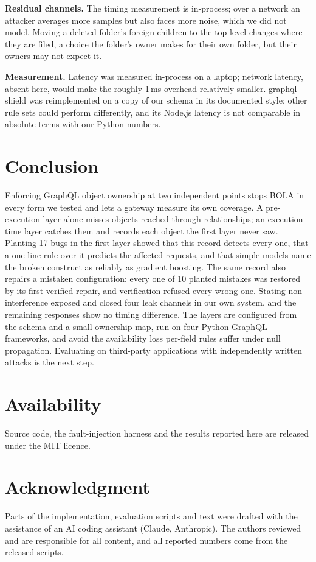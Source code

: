 \documentclass[conference]{IEEEtran}
\begin{document}
\textbf{Residual channels.} The timing measurement is in-process; over a network an attacker averages more samples but also faces more noise, which we did not model. Moving a deleted folder's foreign children to the top level changes where they are filed, a choice the folder's owner makes for their own folder, but their owners may not expect it.

\textbf{Measurement.} Latency was measured in-process on a laptop; network latency, absent here, would make the roughly 1\,ms overhead relatively smaller. graphql-shield was reimplemented on a copy of our schema in its documented style; other rule sets could perform differently, and its Node.js latency is not comparable in absolute terms with our Python numbers.

\section{Conclusion}

Enforcing GraphQL object ownership at two independent points stops BOLA in every form we tested and lets a gateway measure its own coverage. A pre-execution layer alone misses objects reached through relationships; an execution-time layer catches them and records each object the first layer never saw. Planting 17 bugs in the first layer showed that this record detects every one, that a one-line rule over it predicts the affected requests, and that simple models name the broken construct as reliably as gradient boosting. The same record also repairs a mistaken configuration: every one of 10 planted mistakes was restored by its first verified repair, and verification refused every wrong one. Stating non-interference exposed and closed four leak channels in our own system, and the remaining responses show no timing difference. The layers are configured from the schema and a small ownership map, run on four Python GraphQL frameworks, and avoid the availability loss per-field rules suffer under null propagation. Evaluating on third-party applications with independently written attacks is the next step.

\section*{Availability}
Source code, the fault-injection harness and the results reported here are released under the MIT licence.

\section*{Acknowledgment}
Parts of the implementation, evaluation scripts and text were drafted with the assistance of an AI coding assistant (Claude, Anthropic). The authors reviewed and are responsible for all content, and all reported numbers come from the released scripts.



\end{document}
